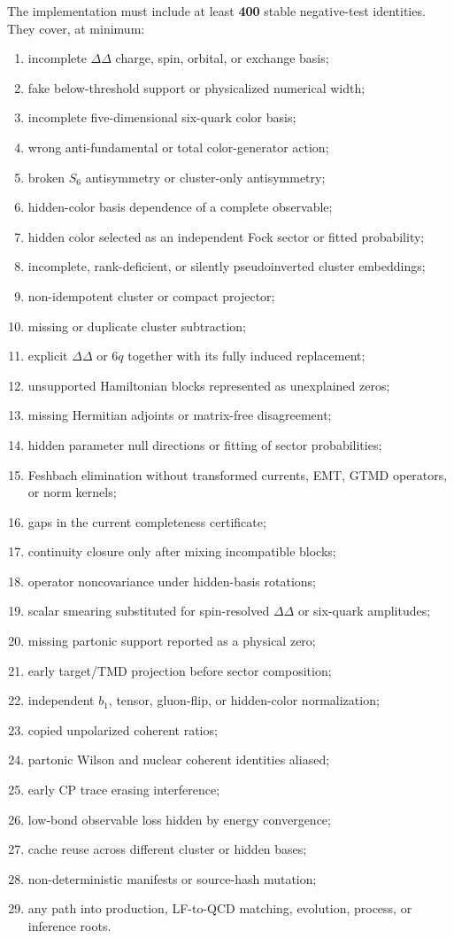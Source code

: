 \documentclass[11pt]{article}
\begin{document}
The implementation must include at least \textbf{400} stable negative-test identities.  They cover, at minimum:
\begin{enumerate}
\item incomplete \(\Delta\Delta\) charge, spin, orbital, or exchange basis;
\item fake below-threshold support or physicalized numerical width;
\item incomplete five-dimensional six-quark color basis;
\item wrong anti-fundamental or total color-generator action;
\item broken \(S_6\) antisymmetry or cluster-only antisymmetry;
\item hidden-color basis dependence of a complete observable;
\item hidden color selected as an independent Fock sector or fitted probability;
\item incomplete, rank-deficient, or silently pseudoinverted cluster embeddings;
\item non-idempotent cluster or compact projector;
\item missing or duplicate cluster subtraction;
\item explicit \(\Delta\Delta\) or \(6q\) together with its fully induced replacement;
\item unsupported Hamiltonian blocks represented as unexplained zeros;
\item missing Hermitian adjoints or matrix-free disagreement;
\item hidden parameter null directions or fitting of sector probabilities;
\item Feshbach elimination without transformed currents, EMT, GTMD operators, or norm kernels;
\item gaps in the current completeness certificate;
\item continuity closure only after mixing incompatible blocks;
\item operator noncovariance under hidden-basis rotations;
\item scalar smearing substituted for spin-resolved \(\Delta\Delta\) or six-quark amplitudes;
\item missing partonic support reported as a physical zero;
\item early target/TMD projection before sector composition;
\item independent \(b_1\), tensor, gluon-flip, or hidden-color normalization;
\item copied unpolarized coherent ratios;
\item partonic Wilson and nuclear coherent identities aliased;
\item early CP trace erasing interference;
\item low-bond observable loss hidden by energy convergence;
\item cache reuse across different cluster or hidden bases;
\item non-deterministic manifests or source-hash mutation;
\item any path into production, LF-to-QCD matching, evolution, process, or inference roots.
\end{enumerate}
\end{document}
